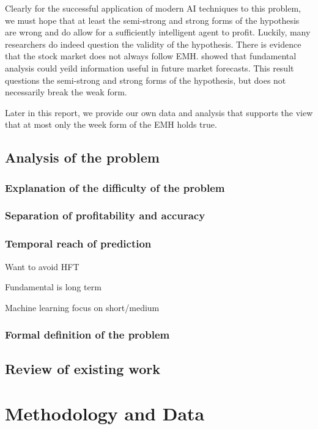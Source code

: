 \documentclass{report}
\begin{document}
Clearly for the successful application of modern AI techniques to this problem, we must hope that at least the semi-strong and strong forms of the hypothesis are wrong and do allow for a sufficiently intelligent agent to profit. Luckily, many researchers do indeed question the validity of the hypothesis. There is evidence that the stock market does not always follow EMH. \citet{basu1983relationship} showed that fundamental analysis could yeild information useful in future market forecasts. This result questions the semi-strong and strong forms of the hypothesis, but does not necessarily break the weak form. 

Later in this report, we provide our own data and analysis that supports the view that at most only the week form of the EMH holds true.

\subsection{Analysis of the problem}
\subsubsection{Explanation of the difficulty of the problem}
\subsubsection{Separation of profitability and accuracy}
\subsubsection{Temporal reach of prediction}

Want to avoid HFT

Fundamental is long term

Machine learning focus on short/medium

\subsubsection{Formal definition of the problem}

\subsection{Review of existing work}

\section{Methodology and Data}
\end{document}

